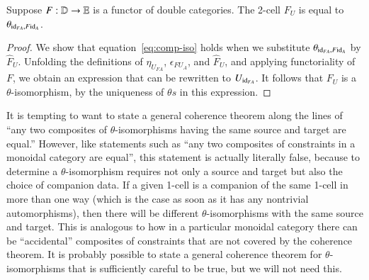 
\begin{lem}\label{lem:FUtheta}
Suppose $F:\mathbb{D} \rightarrow \mathbb{E}$ is a functor of double categories. The 2-cell $F_U$ is equal to $\theta_{\mathrm{id}_{FA}, F\mathrm{id}_A}$.
\end{lem}

\begin{proof}
We show that equation~\eqref{eq:comp-iso} holds when we substitute $\theta_{\mathrm{id}_{FA}, F\mathrm{id}_A}$ by $\hat{F}_U$.  Unfolding the definitions of $\eta_{U_{FA}}$, $\epsilon_{FU_A}$, and $\hat{F}_U$, and applying functoriality of $F$, we obtain an expression that can be rewritten to $U_{\mathrm{id}_{FA}}$. It follows that $F_U$ is a $\theta$-isomorphism, by the uniqueness of $\theta s$ in this expression.
\end{proof}

\begin{rmk}
  It is tempting to want to state a general coherence theorem along the lines of ``any two composites of $\theta$-isomorphisms having the same source and target are equal.''
  However, like statements such as ``any two composites of constraints in a monoidal category are equal'', this statement is actually literally false, because to determine a $\theta$-isomorphism requires not only a source and target but also the choice of companion data.
  If a given 1-cell is a companion of the same 1-cell in more than one way (which is the case as soon as it has any nontrivial automorphisms), then there will be different $\theta$-isomorphisms with the same source and target.
  This is analogous to how in a particular monoidal category there can be ``accidental'' composites of constraints that are not covered by the coherence theorem.
  It is probably possible to state a general coherence theorem for $\theta$-isomorphisms that is sufficiently careful to be true, but we will not need this.
\end{rmk}


